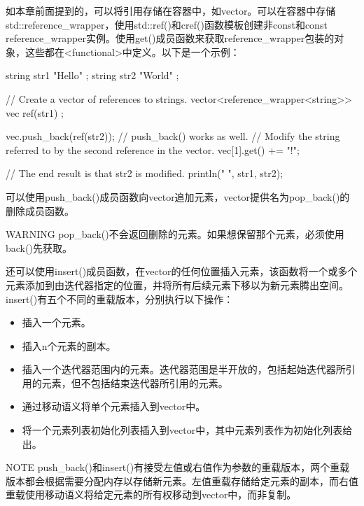 
如本章前面提到的，可以将引用存储在容器中，如vector。可以在容器中存储std::reference\_wrapper，使用std::ref()和cref()函数模板创建非const和const reference\_wrapper实例。使用get()成员函数来获取reference\_wrapper包装的对象，这些都在<functional>中定义。以下是一个示例：

\begin{cpp}
string str1 { "Hello" };
string str2 { "World" };

// Create a vector of references to strings.
vector<reference_wrapper<string>> vec { ref(str1) };

vec.push_back(ref(str2)); // push_back() works as well.
// Modify the string referred to by the second reference in the vector.
vec[1].get() += "!";

// The end result is that str2 is modified.
println("{} {}", str1, str2);
\end{cpp}


可以使用push\_back()成员函数向vector追加元素，vector提供名为pop\_back()的删除成员函数。

\begin{myWarning}{WARNING}
pop\_back()不会返回删除的元素。如果想保留那个元素，必须使用back()先获取。
\end{myWarning}

还可以使用insert()成员函数，在vector的任何位置插入元素，该函数将一个或多个元素添加到由迭代器指定的位置，并将所有后续元素下移以为新元素腾出空间。insert()有五个不同的重载版本，分别执行以下操作：

\begin{itemize}
\item
插入一个元素。

\item
插入n个元素的副本。

\item
插入一个迭代器范围内的元素。迭代器范围是半开放的，包括起始迭代器所引用的元素，但不包括结束迭代器所引用的元素。

\item
通过移动语义将单个元素插入到vector中。

\item
将一个元素列表初始化列表插入到vector中，其中元素列表作为初始化列表给出。
\end{itemize}

\begin{myNotic}{NOTE}
push\_back()和insert()有接受左值或右值作为参数的重载版本，两个重载版本都会根据需要分配内存以存储新元素。左值重载存储给定元素的副本，而右值重载使用移动语义将给定元素的所有权移动到vector中，而非复制。
\end{myNotic}


